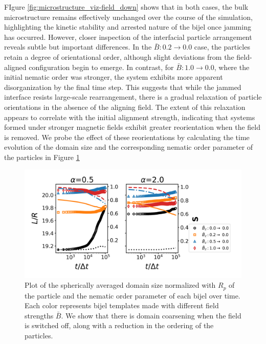 FIgure \ref{fig:microstructure_viz-field_down} shows that in 
both cases, the bulk microstructure remains effectively unchanged over the course of the simulation, highlighting the 
kinetic stability and arrested nature of the bijel once jamming has occurred.
However, closer inspection of the interfacial particle arrangement reveals subtle but important differences. In the 
\(\bar{B}: 0.2 \rightarrow 0.0\) case, the particles retain a degree of orientational order, although slight deviations 
from the field-aligned configuration begin to emerge. In contrast, for \(\bar{B}: 1.0 \rightarrow 0.0\), where the 
initial nematic order was stronger, the system exhibits more apparent disorganization by the final time step. This 
suggests that while the jammed interface resists large-scale rearrangement, there is a gradual relaxation of particle 
orientations in the absence of the aligning field. The extent of this relaxation appears to correlate with the initial 
alignment strength, indicating that systems formed under stronger magnetic fields exhibit greater reorientation when 
the field is removed. We probe the effect of these reorientations by calculating the time evolution of the domain size
and the corresponding nematic order parameter of the particles in Figure \ref{fig:domain_size-field_down}

\begin{figure} 
\centering 
\includegraphics[scale=0.6]{../figures/results/paper2/domain_size-field_down.png} 
\caption{Plot of the spherically averaged domain size normalized with $R_p$ of the particle and the nematic order parameter of each bijel over time. 
         Each color represents bijel templates made with different field strengths $\bar{B}$. We show that there is domain coarsening when the field 
         is switched off, along with a reduction in the ordering of the particles.} 
\label{fig:domain_size-field_down} 
\end{figure}

